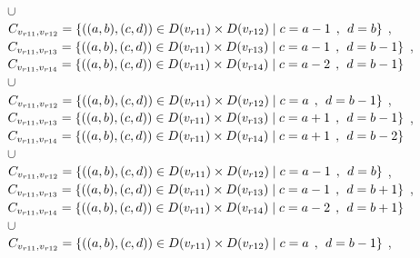 \\$\cup$
\\$C_{v_{r11},v_{r12}}=\{((a,b),(c,d))\in D(v_{r11}) \times D(v_{r12})\mid c = a - 1\hspace{1ex} , \hspace{1ex}  d = b   \}$ , 
\\$C_{v_{r11},v_{r13}}=\{((a,b),(c,d))\in D(v_{r11}) \times D(v_{r13})\mid c = a - 1\hspace{1ex} , \hspace{1ex}  d = b - 1 \}$ , 
\\$C_{v_{r11},v_{r14}}=\{((a,b),(c,d))\in D(v_{r11}) \times D(v_{r14})\mid c = a - 2\hspace{1ex} , \hspace{1ex}  d = b - 1 \}$  
\\$\cup$
\\$C_{v_{r11},v_{r12}}=\{((a,b),(c,d))\in D(v_{r11}) \times D(v_{r12})\mid c = a   \hspace{1ex} , \hspace{1ex}  d = b - 1 \}$ , 
\\$C_{v_{r11},v_{r13}}=\{((a,b),(c,d))\in D(v_{r11}) \times D(v_{r13})\mid c = a + 1\hspace{1ex} , \hspace{1ex}  d = b - 1 \}$ , 
\\$C_{v_{r11},v_{r14}}=\{((a,b),(c,d))\in D(v_{r11}) \times D(v_{r14})\mid c = a + 1\hspace{1ex} , \hspace{1ex}  d = b - 2 \}$  
\\$\cup$
\\$C_{v_{r11},v_{r12}}=\{((a,b),(c,d))\in D(v_{r11}) \times D(v_{r12})\mid c = a - 1\hspace{1ex} , \hspace{1ex}  d = b    \}$ , 
\\$C_{v_{r11},v_{r13}}=\{((a,b),(c,d))\in D(v_{r11}) \times D(v_{r13})\mid c = a - 1\hspace{1ex} , \hspace{1ex}  d = b + 1 \}$ , 
\\$C_{v_{r11},v_{r14}}=\{((a,b),(c,d))\in D(v_{r11}) \times D(v_{r14})\mid c = a - 2\hspace{1ex} , \hspace{1ex}  d = b + 1 \}$  
\\$\cup$
\\$C_{v_{r11},v_{r12}}=\{((a,b),(c,d))\in D(v_{r11}) \times D(v_{r12})\mid c = a  \hspace{1ex} , \hspace{1ex}  d = b - 1 \}$ , 
